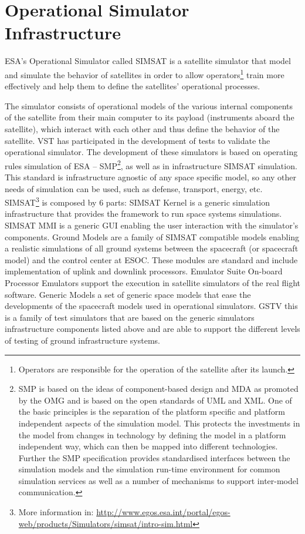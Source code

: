 \section{Operational Simulator Infrastructure}
\ac{ESA}'s Operational Simulator called \ac{SIMSAT}
is a satellite simulator that model and simulate
the behavior of satellites in order to allow operators\footnote{Operators are responsible for the operation of the satellite after its launch.} train more effectively 
and help them to define the satellites' operational processes.

The simulator consists of operational models of the various internal components of the satellite from their main computer to its payload (instruments aboard the satellite),
which interact with each other and thus define the behavior of the satellite.
\ac{VST} has participated in the development of tests to validate the operational simulator.
The development of these simulators is based on operating rules simulation of
\ac{ESA} -- \ac{SMP}\footnote{\ac{SMP} is based on the ideas of component-based design and \ac{MDA}
as promoted by the \ac{OMG} and is based on the open standards of \ac{UML} and \ac{XML}.
One of the basic principles is the separation of the platform specific and platform independent aspects of the simulation model.
This protects the investments in the model from changes in technology by defining the model in a platform independent way, which can then be mapped into different technologies.
Further the \ac{SMP} specification provides standardised interfaces between the simulation models and the simulation run-time environment for common simulation services as well as a
number of mechanisms to support inter-model communication.\cite{1A,2A,3A,4A,5A}}, as well as in infrastructure \ac{SIMSAT} simulation.
This standard is infrastructure agnostic of any space specific model, so any other needs of simulation can be used, such as defense, transport, energy, etc.\\
\ac{SIMSAT}\footnote{More information in: \url{http://www.egos.esa.int/portal/egos-web/products/Simulators/simsat/intro-sim.html}} is composed by $6$ parts:
\ac{SIMSAT} Kernel is a generic simulation infrastructure that provides the framework to run space systems simulations.
\ac{SIMSAT} \ac{MMI} is a generic \ac{GUI} enabling the user interaction with the simulator's components.
Ground Models are a family of \ac{SIMSAT} compatible models enabling a realistic simulations of all ground systems between the spacecraft (or spacecraft model)
and the control center at \ac{ESOC}\cite{Martin_whitepaper}. These modules are standard and include implementation of uplink and downlink processors.
Emulator Suite On-board Processor Emulators support the execution in satellite simulators of the real flight software.
Generic Models a set of generic space models that ease the developments of the spacecraft models used in operational simulators.
\ac{GSTV} this is a family of test simulators that are based on the generic simulators infrastructure components listed above and are able to support the different levels
of testing of ground infrastructure systems.\\

